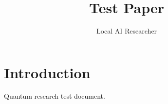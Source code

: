 \documentclass{article}
\begin{document}
\title{Test Paper}
\author{Local AI Researcher}
\maketitle
\section{Introduction}
Quantum research test document.
\end{document}
